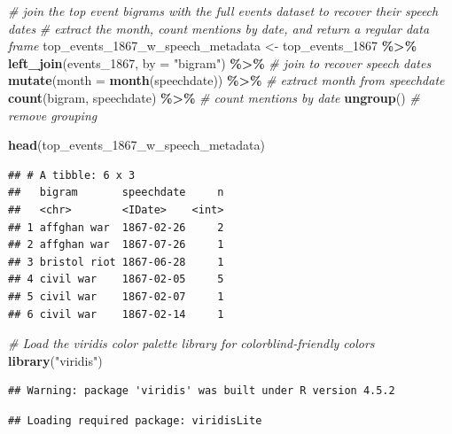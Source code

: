 \documentclass[
]{article}
\newenvironment{Shaded}{\begin{snugshade}}{\end{snugshade}}
\newcommand{\AttributeTok}[1]{\textcolor[rgb]{0.13,0.29,0.53}{#1}}
\newcommand{\CommentTok}[1]{\textcolor[rgb]{0.56,0.35,0.01}{\textit{#1}}}
\newcommand{\FunctionTok}[1]{\textcolor[rgb]{0.13,0.29,0.53}{\textbf{#1}}}
\newcommand{\NormalTok}[1]{#1}
\newcommand{\OtherTok}[1]{\textcolor[rgb]{0.56,0.35,0.01}{#1}}
\newcommand{\SpecialCharTok}[1]{\textcolor[rgb]{0.81,0.36,0.00}{\textbf{#1}}}
\newcommand{\StringTok}[1]{\textcolor[rgb]{0.31,0.60,0.02}{#1}}
\begin{document}
\begin{Shaded}
\begin{Highlighting}[]
\CommentTok{\# join the top event bigrams with the full events dataset to recover their speech dates}
\CommentTok{\# extract the month, count mentions by date, and return a regular data frame}
\NormalTok{top\_events\_1867\_w\_speech\_metadata }\OtherTok{\textless{}{-}}\NormalTok{ top\_events\_1867 }\SpecialCharTok{\%\textgreater{}\%}
  \FunctionTok{left\_join}\NormalTok{(events\_1867, }\AttributeTok{by =} \StringTok{"bigram"}\NormalTok{) }\SpecialCharTok{\%\textgreater{}\%}  \CommentTok{\# join to recover speech dates}
  \FunctionTok{mutate}\NormalTok{(}\AttributeTok{month =} \FunctionTok{month}\NormalTok{(speechdate)) }\SpecialCharTok{\%\textgreater{}\%} \CommentTok{\# extract month from speechdate}
  \FunctionTok{count}\NormalTok{(bigram, speechdate) }\SpecialCharTok{\%\textgreater{}\%} \CommentTok{\# count mentions by date}
  \FunctionTok{ungroup}\NormalTok{() }\CommentTok{\# remove grouping}

\FunctionTok{head}\NormalTok{(top\_events\_1867\_w\_speech\_metadata)}
\end{Highlighting}
\end{Shaded}

\begin{verbatim}
## # A tibble: 6 x 3
##   bigram       speechdate     n
##   <chr>        <IDate>    <int>
## 1 affghan war  1867-02-26     2
## 2 affghan war  1867-07-26     1
## 3 bristol riot 1867-06-28     1
## 4 civil war    1867-02-05     5
## 5 civil war    1867-02-07     1
## 6 civil war    1867-02-14     1
\end{verbatim}

\begin{Shaded}
\begin{Highlighting}[]
\CommentTok{\# Load the viridis color palette library for colorblind{-}friendly colors}
\FunctionTok{library}\NormalTok{(}\StringTok{"viridis"}\NormalTok{)}
\end{Highlighting}
\end{Shaded}

\begin{verbatim}
## Warning: package 'viridis' was built under R version 4.5.2
\end{verbatim}

\begin{verbatim}
## Loading required package: viridisLite
\end{verbatim}
\end{document}
